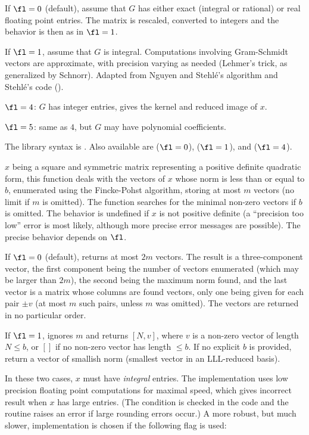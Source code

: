 If $\fl=0$ (default), assume that $G$ has either exact (integral or
rational) or real floating point entries. The matrix is rescaled, converted
to integers and the behavior is then as in $\fl = 1$.

If $\fl=1$, assume that $G$ is integral. Computations involving Gram-Schmidt
vectors are approximate, with precision varying as needed (Lehmer's trick,
as generalized by Schnorr). Adapted from Nguyen and Stehl\'e's algorithm
and Stehl\'e's code ().

$\fl=4$: $G$ has integer entries, gives the kernel and reduced image of $x$.

$\fl=5$: same as $4$, but $G$ may have polynomial coefficients.

The library syntax is .
Also available are  ($\fl=0$),
 ($\fl=1$), and 
($\fl=4$).

\label{se:qfminim}
$x$ being a square and symmetric matrix representing a positive definite
quadratic form, this function deals with the vectors of $x$ whose norm is
less than or equal to $b$, enumerated using the Fincke-Pohst algorithm,
storing at most $m$ vectors (no limit if $m$ is omitted). The function
searches for the minimal non-zero vectors if $b$ is omitted. The behavior is
undefined if $x$ is not positive definite (a ``precision too low'' error is
most likely, although more precise error messages are possible). The precise
behavior depends on $\fl$.

If $\fl=0$ (default), returns at most $2m$ vectors. The result is a
three-component vector, the first component being the number of vectors
enumerated (which may be larger than $2m$), the second being the maximum
norm found, and the last vector
is a matrix whose columns are found vectors, only one being given for each
pair $\pm v$ (at most $m$ such pairs, unless $m$ was omitted). The vectors
are returned in no particular order.

If $\fl=1$, ignores $m$ and returns $[N,v]$, where $v$ is a non-zero vector
of length $N \leq b$, or $[]$ if no non-zero vector has length $\leq b$.
If no explicit $b$ is provided, return a vector of smallish norm
(smallest vector in an LLL-reduced basis).

In these two cases, $x$ must have \emph{integral} entries. The
implementation uses low precision floating point computations for maximal
speed, which gives incorrect result when $x$ has large entries. (The
condition is checked in the code and the routine raises an error if
large rounding errors occur.) A more robust, but much slower,
implementation is chosen if the following flag is used:

